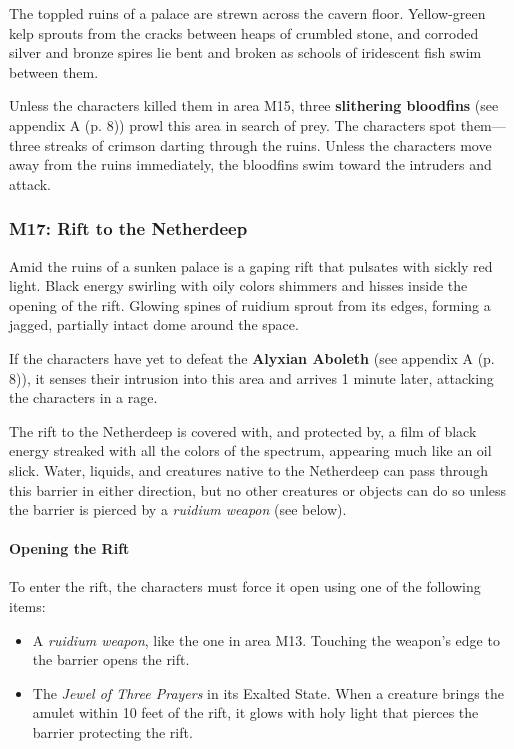 \documentclass[letterpaper, 11pt, bg=full, twocolumn]{dndbook}
\begin{document}
\begin{DndReadAloud}
The toppled ruins of a palace are strewn across the cavern floor. Yellow-green kelp sprouts from the cracks between heaps of crumbled stone, and corroded silver and bronze spires lie bent and broken as schools of iridescent fish swim between them.
\end{DndReadAloud}

Unless the characters killed them in area M15, three \textbf{slithering bloodfins} (see appendix A (p. 8)) prowl this area in search of prey. The characters spot them---three streaks of crimson darting through the ruins. Unless the characters move away from the ruins immediately, the bloodfins swim toward the intruders and attack.

\subsubsection{M17: Rift to the Netherdeep}

\begin{DndReadAloud}
Amid the ruins of a sunken palace is a gaping rift that pulsates with sickly red light. Black energy swirling with oily colors shimmers and hisses inside the opening of the rift. Glowing spines of ruidium sprout from its edges, forming a jagged, partially intact dome around the space.
\end{DndReadAloud}

If the characters have yet to defeat the \textbf{Alyxian Aboleth} (see appendix A (p. 8)), it senses their intrusion into this area and arrives 1 minute later, attacking the characters in a rage.

The rift to the Netherdeep is covered with, and protected by, a film of black energy streaked with all the colors of the spectrum, appearing much like an oil slick. Water, liquids, and creatures native to the Netherdeep can pass through this barrier in either direction, but no other creatures or objects can do so unless the barrier is pierced by a \textit{ruidium weapon} (see below).

\paragraph{Opening the Rift}

To enter the rift, the characters must force it open using one of the following items:

\begin{itemize}
\item A \textit{ruidium weapon}, like the one in area M13. Touching the weapon's edge to the barrier opens the rift.
\item The \textit{Jewel of Three Prayers} in its Exalted State. When a creature brings the amulet within 10 feet of the rift, it glows with holy light that pierces the barrier protecting the rift.
\end{itemize}
\end{document}
